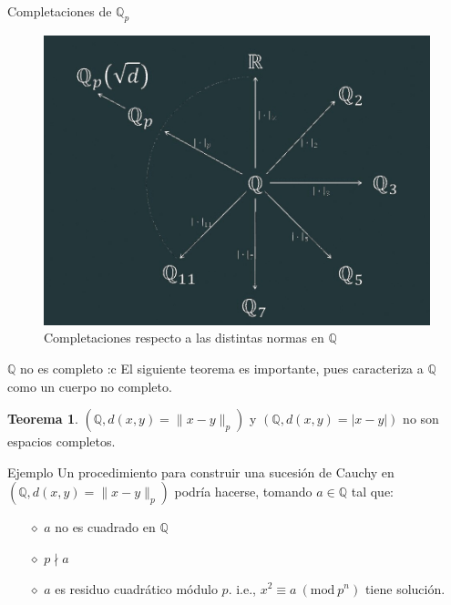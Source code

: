\documentclass{beamer}
\theoremstyle{definition}
\numberwithin{equation}{section}
\newcommand{\orangee}[1]{\textcolor{thColor}{#1}}
\newtheorem{thh}{\orangee{Teorema}}
\newcommand{\Mod}[1]{\ (\mathrm{mod}\ #1)}
\newcommand{\Q}{\mathbb{Q}}
\newcommand{\Qp}{\mathbb{Q}_p}
\newcommand{\pnorm}[1]{\|#1\|_p}
\begin{document}
\begin{frame}[fragile]{Completaciones de $\Qp$}

	\begin{figure}
		\includegraphics[scale=0.35]{img/relojBeamer.jpg}\caption{Completaciones respecto a las distintas normas en $\Q$}
 	\end{figure}
\end{frame}
\iffalse 
\begin{frame}{$\Q$ no es completo :c}
	El siguiente teorema es importante, pues caracteriza a $\Q$ como un cuerpo no completo.
	\begin{thh}
		$ (\Q, d (x,y)=\pnorm{x-y})$ y $ (\Q, d (x,y)=|x-y|)$ no son espacios completos.
	\end{thh}
\begin{exampleblock}{Ejemplo}
	Un procedimiento para construir una sucesión de Cauchy en $ (\Q, d (x,y)=\pnorm{x-y})$ podría hacerse, tomando $a\in\Q$ tal que:
	\begin{itemize}[<+- | alert@+>]
		\item[$\diamond$] $a$ no es cuadrado en $\Q$
		\item[$\diamond$] $p \nmid a$
		\item[$\diamond$] $a$ es residuo cuadrático módulo $p$. i.e., $x^2 \equiv a \Mod{p^n}$ tiene solución.
	\end{itemize}
\end{exampleblock}
\end{frame}


\end{document}
